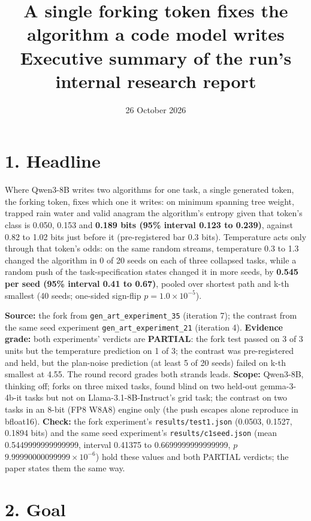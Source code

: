 \documentclass[10pt]{article}
\title{A single forking token fixes the algorithm a code model writes\\[0.3em]
\large Executive summary of the run's internal research report}
\date{26 October 2026}
\author{}
\begin{document}
\maketitle
\vspace{-2.5em}

\section*{1. Headline}

Where Qwen3-8B writes two algorithms for one task, a single generated token, the forking token, fixes which one it
writes: on minimum spanning tree weight, trapped rain water and valid anagram the algorithm's entropy given that token's
class is 0.050, 0.153 and \textbf{0.189 bits (95\% interval 0.123 to 0.239)}, against 0.82 to 1.02 bits just before it
(pre-registered bar 0.3 bits). Temperature acts only through that token's odds: on the same random streams, temperature
0.3 to 1.3 changed the algorithm in 0 of 20 seeds on each of three collapsed tasks, while a random push of the
task-specification states changed it in more seeds, by \textbf{0.545 per seed (95\% interval 0.41 to 0.67)}, pooled
over shortest path and k-th smallest (40 seeds; one-sided sign-flip $p = 1.0\times10^{-5}$).

\textbf{Source:} the fork from \texttt{gen\_\allowbreak{}art\_\allowbreak{}experiment\_\allowbreak{}35} (iteration 7);
the contrast from the same seed experiment \texttt{gen\_\allowbreak{}art\_\allowbreak{}experiment\_\allowbreak{}21}
(iteration 4).
\textbf{Evidence grade:} both experiments' verdicts are \textbf{PARTIAL}: the fork test passed on 3 of 3 units but the
temperature prediction on 1 of 3; the contrast was pre-registered and held, but the plan-noise prediction (at least 5 of
20 seeds) failed on k-th smallest at 4.55. The round record grades both strands leads.
\textbf{Scope:} Qwen3-8B, thinking off; forks on three mixed tasks, found blind on two held-out gemma-3-4b-it tasks
but not on Llama-3.1-8B-Instruct's grid task; the contrast on two tasks in an 8-bit (FP8 W8A8) engine only (the push
escapes alone reproduce in bfloat16).
\textbf{Check:} the fork experiment's \texttt{results/test1.json} (0.0503, 0.1527, 0.1894 bits) and the same seed
experiment's \texttt{results/c1seed.json} (mean 0.5449999999999999, interval 0.41375 to 0.6699999999999999,
$p$ $9.99990000099999\times10^{-6}$) hold these values and both PARTIAL verdicts; the paper states them the same way.

\section*{2. Goal}
\end{document}

